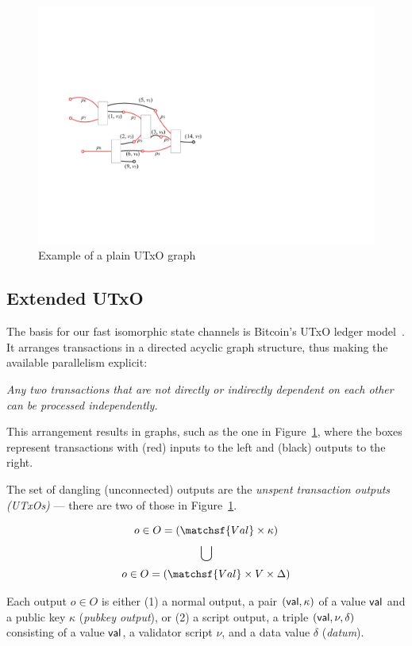 \begin{figure}[t]
  \centering
  \includegraphics[scale=.2,width=\textwidth/2]{figures/utxo-graph.pdf}
  \caption{Example of a plain UTxO graph}
  \label{fig:utxo-graph}
\end{figure}

\subsection{Extended UTxO}
The basis for our fast isomorphic state channels is Bitcoin's UTxO ledger model~\cite{formal-model-of-bitcoin-transactions,Zahnentferner18-UTxO}. It arranges transactions in a directed acyclic graph structure, thus making the available parallelism explicit: 

\emph{Any two transactions that are not directly or indirectly dependent on each other can be processed independently.}

This arrangement results in graphs, such as the one in Figure~\ref{fig:utxo-graph},
where the boxes represent transactions with (red) inputs to the left and (black) outputs to the
right.

The set of dangling (unconnected) outputs are the \emph{unspent transaction outputs (UTxOs)} --- there are two of those in Figure~\ref{fig:utxo-graph}. 

\begin{definition}[Outputs]
$$
o \in O = (\matchsf{Val} \times \kappa)
$$
$$\bigcup$$
$$
o \in O = (\matchsf{Val} \times V \times \Delta)
$$

Each output \(o\in O\) is either (1) a normal output, a pair \((\mathsf{val}, \kappa)\)
of a value $\mathsf{val}$ and a public key $\kappa$ (\emph{pubkey
output}), or (2) a script output, a triple \((\mathsf{val}, \nu, \delta)\) consisting of a value
$\mathsf{val}$, a validator script $\nu$, and a data value $\delta$ (\emph{datum}).
\end{definition}

